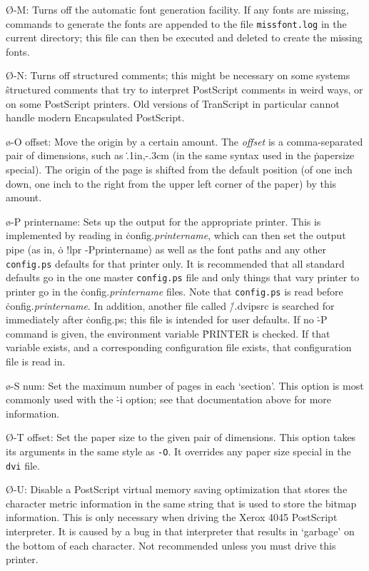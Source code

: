 {\O-M:
Turns off the automatic font generation facility.  If any fonts are
missing, commands to generate the fonts are appended to the file
{\tt missfont.log} in the current directory; this file can then be
executed and deleted to create the missing fonts.

\O-N:
Turns off structured comments; this might be necessary on some systems
\^{structured comments}
that try to interpret PostScript comments in weird ways, or on some
PostScript printers.  Old versions of TranScript in particular cannot
handle modern Encapsulated PostScript.

\o-O offset:
Move the origin by a certain amount.  The {\it offset} is a comma-separated
pair of dimensions, such as \.{.1in,-.3cm} (in the same syntax used in
the \.{papersize} special).   The origin of the page is shifted from the
default position (of one inch down, one inch to the right from the upper
left corner of the paper) by this amount.

\o-P printername:
Sets up the output for the appropriate printer.  This is implemented
by reading in \.{config.{\it printername}}, which can then set the output pipe
(as in, \.{o !lpr -Pprintername}) as well as the font paths and any other
\^{{\tt config.ps}}
defaults for that printer only.  It is recommended that all standard
defaults go in the one master {\tt config.ps}
file and only things that vary
printer to printer go in the \.{config.{\it printername}}
files.  Note that {\tt config.ps}
is read before \.{config.{\it printername}}.
In addition, another file called \.{\tilde/.dvipsrc}
is searched for immediately after \.{config.ps};
this file is intended for user defaults.  If no \.{-P} command is
given, the environment variable \.{PRINTER} is checked.  If that
variable exists, and a corresponding configuration
file exists, that configuration file is read in.

\o-S num:
Set the maximum number of pages in each `section'.  This option is most
commonly used with the \.{-i} option; see that documentation above for more
information.

\O-T offset:
Set the paper size to the given pair of dimensions.  This option takes
its arguments in the same style as {\tt -O}.  It overrides any paper
size special in the {\tt dvi} file.

\O-U:
Disable a PostScript virtual memory saving optimization that stores the
character metric information in the same string that is used to store
the bitmap information.  This is only necessary when driving the Xerox
4045 PostScript interpreter.  It is caused by a bug in that interpreter
that results in `garbage' on the bottom of each character.  Not
recommended unless you must drive this printer.

}
